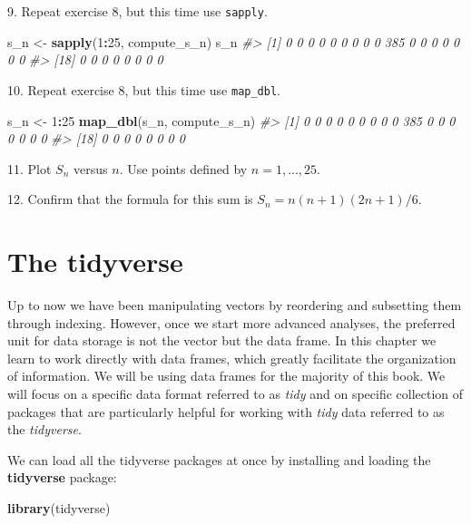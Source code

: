 \documentclass[
]{krantz}
\newenvironment{Shaded}{\begin{snugshade}}{\end{snugshade}}
\newcommand{\CommentTok}[1]{\textcolor[rgb]{0.37,0.37,0.37}{\textit{#1}}}
\newcommand{\DecValTok}[1]{\textcolor[rgb]{0.06,0.06,0.06}{#1}}
\newcommand{\KeywordTok}[1]{\textcolor[rgb]{0.27,0.27,0.27}{\textbf{#1}}}
\newcommand{\NormalTok}[1]{#1}
\newcommand{\OperatorTok}[1]{\textcolor[rgb]{0.43,0.43,0.43}{\textbf{#1}}}
\newcommand{\StringTok}[1]{\textcolor[rgb]{0.5,0.5,0.5}{#1}}
\begin{document}
9. Repeat exercise 8, but this time use \texttt{sapply}.

\begin{Shaded}
\begin{Highlighting}[]
\NormalTok{s_n <-}\StringTok{ }\KeywordTok{sapply}\NormalTok{(}\DecValTok{1}\OperatorTok{:}\DecValTok{25}\NormalTok{, compute_s_n)}
\NormalTok{s_n}
\CommentTok{#>  [1]   0   0   0   0   0   0   0   0   0 385   0   0   0   0   0   0   0}
\CommentTok{#> [18]   0   0   0   0   0   0   0   0}
\end{Highlighting}
\end{Shaded}

10. Repeat exercise 8, but this time use \texttt{map\_dbl}.

\begin{Shaded}
\begin{Highlighting}[]
\NormalTok{s_n <-}\StringTok{ }\DecValTok{1}\OperatorTok{:}\DecValTok{25}
\KeywordTok{map_dbl}\NormalTok{(s_n, compute_s_n)}
\CommentTok{#>  [1]   0   0   0   0   0   0   0   0   0 385   0   0   0   0   0   0   0}
\CommentTok{#> [18]   0   0   0   0   0   0   0   0}
\end{Highlighting}
\end{Shaded}

11. Plot \(S_n\) versus \(n\). Use points defined by \(n=1,\dots,25\).

12. Confirm that the formula for this sum is \(S_n= n(n+1)(2n+1)/6\).

\hypertarget{tidyverse}{%
\chapter{The tidyverse}\label{tidyverse}}

Up to now we have been manipulating vectors by reordering and subsetting them through indexing. However, once we start more advanced analyses, the preferred unit for data storage is not the vector but the data frame. In this chapter we learn to work directly with data frames, which greatly facilitate the organization of information. We will be using data frames for the majority of this book. We will focus on a specific data format referred to as \emph{tidy} and on specific collection of packages that are particularly helpful for working with \emph{tidy} data referred to as the \emph{tidyverse}.

We can load all the tidyverse packages at once by installing and loading the \textbf{tidyverse} package:

\begin{Shaded}
\begin{Highlighting}[]
\KeywordTok{library}\NormalTok{(tidyverse)}
\end{Highlighting}
\end{Shaded}
\end{document}
